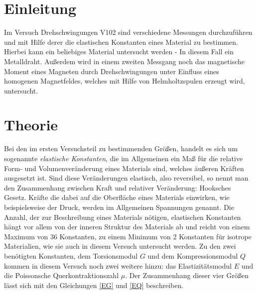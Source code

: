 



  \section{Einleitung}
    Im Versuch Drehschwingungen V102 sind verschiedene Messungen durchzuführen und mit Hilfe 
    derer die elastischen Konstanten eines Material zu bestimmen. Hierbei kann ein beliebiges Material 
    untersucht werden - In diesem Fall ein Metalldraht. 
    Außerdem wird in einem zweiten Messgang noch das magnetische Moment eines Magneten durch 
    Drehschwingungen unter Einfluss eines homogenen Magnetfeldes, welches mit Hilfe von Helmholtzspulen erzeugt wird, untersucht.


  
  
  
  
  
    
    
    
    
    
    
  \section{Theorie}
    Bei den im ersten Versuchsteil zu bestimmenden Größen, handelt es sich um sogenannte \emph{elastische Konstanten},
    die im Allgemeinen ein Maß für die relative Form- und Volumenveränderung eines Materials sind, welches äußeren Kräften
    ausgesetzt ist. Sind diese Veränderungen elastisch, also reversibel, so nennt man den Zusammenhang zwischen Kraft und 
    relativer Veränderung: Hooksches Gesetz. 
    Kräfte die dabei auf die Oberfläche eines Materials einwirken, wie beispielsweise der Druck, werden
    im Allgemeinen Spannungen genannt. Die Anzahl, der zur Beschreibung eines Materials nötigen, elastischen Konstanten 
    hängt vor allem von der inneren Struktur des Materials ab und reicht von einem Maximum von 36 Konstanten, zu einem
    Minimum von 2 Konstanten für isotrope Materialien, wie sie auch in diesem Versuch untersucht werden.
    Zu den zwei benötigten Konstanten, dem Torsionsmodul $G$ und dem Kompressionsmodul $Q$ kommen in diesem Versuch
    noch zwei weitere hinzu: das Elastizitätsmodul $E$ und die Poissonsche Querkontraktionszahl $\mu$.
    Der Zusammenhang dieser vier Größen lässt sich mit den Gleichungen \eqref{EG} und \eqref{EQ} beschreiben.
    
